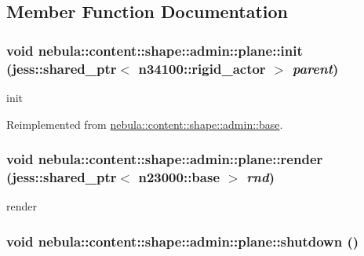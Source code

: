 \subsection{Member Function Documentation}
\hypertarget{classnebula_1_1content_1_1shape_1_1admin_1_1plane_a6d4175d9e25c15ed2d4f07c0ba7ccb2e}{
\subsubsection[{init}]{\setlength{\rightskip}{0pt plus 5cm}void nebula::content::shape::admin::plane::init (jess::shared\_\-ptr$<$ {\bf n34100::rigid\_\-actor} $>$ {\em parent})}}
\label{classnebula_1_1content_1_1shape_1_1admin_1_1plane_a6d4175d9e25c15ed2d4f07c0ba7ccb2e}


init 

Reimplemented from \hyperlink{classnebula_1_1content_1_1shape_1_1admin_1_1base_ae02304c56a4c72ac3b845e71289f450b}{nebula::content::shape::admin::base}.\hypertarget{classnebula_1_1content_1_1shape_1_1admin_1_1plane_af70061ee4169a4f2abc40d43e6b6ea7c}{
\subsubsection[{render}]{\setlength{\rightskip}{0pt plus 5cm}void nebula::content::shape::admin::plane::render (jess::shared\_\-ptr$<$ {\bf n23000::base} $>$ {\em rnd})}}
\label{classnebula_1_1content_1_1shape_1_1admin_1_1plane_af70061ee4169a4f2abc40d43e6b6ea7c}


render \hypertarget{classnebula_1_1content_1_1shape_1_1admin_1_1plane_ac713ec10355d797e07aabad0c4ebd32b}{
\subsubsection[{shutdown}]{\setlength{\rightskip}{0pt plus 5cm}void nebula::content::shape::admin::plane::shutdown ()}}
\label{classnebula_1_1content_1_1shape_1_1admin_1_1plane_ac713ec10355d797e07aabad0c4ebd32b}


